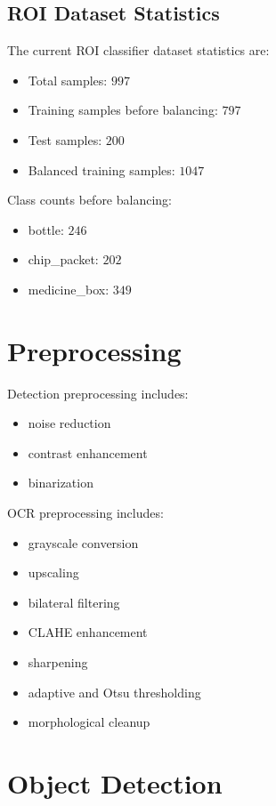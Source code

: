 \documentclass[12pt,a4paper]{article}
\begin{document}
\subsection{ROI Dataset Statistics}

The current ROI classifier dataset statistics are:
\begin{itemize}
  \item Total samples: \(997\)
  \item Training samples before balancing: \(797\)
  \item Test samples: \(200\)
  \item Balanced training samples: \(1047\)
\end{itemize}

Class counts before balancing:
\begin{itemize}
  \item bottle: \(246\)
  \item chip\_packet: \(202\)
  \item medicine\_box: \(349\)
\end{itemize}

\section{Preprocessing}

Detection preprocessing includes:
\begin{itemize}
  \item noise reduction
  \item contrast enhancement
  \item binarization
\end{itemize}

OCR preprocessing includes:
\begin{itemize}
  \item grayscale conversion
  \item upscaling
  \item bilateral filtering
  \item CLAHE enhancement
  \item sharpening
  \item adaptive and Otsu thresholding
  \item morphological cleanup
\end{itemize}

\section{Object Detection}
\end{document}
